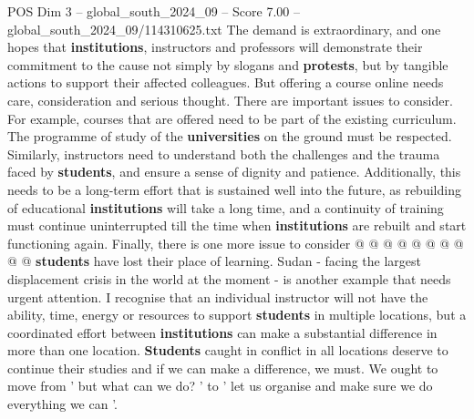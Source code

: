 \begin{textsample}{POS Dim 3 – global\_south\_2024\_09 – Score 7.00 – global\_south\_2024\_09/114310625.txt}
The demand is extraordinary, and one hopes that \textbf{institutions}, instructors and professors will demonstrate their commitment to the cause not simply by slogans and \textbf{protests}, but by tangible actions to support their affected colleagues.
But offering a course online needs care, consideration and serious thought.
There are important issues to consider.
For example, courses that are offered need to be part of the existing curriculum.
The programme of study of the \textbf{universities} on the ground must be respected.
Similarly, instructors need to understand both the challenges and the trauma faced by \textbf{students}, and ensure a sense of dignity and patience.
Additionally, this needs to be a long-term effort that is sustained well into the future, as rebuilding of educational \textbf{institutions} will take a long time, and a continuity of training must continue uninterrupted till the time when \textbf{institutions} are rebuilt and start functioning again.
Finally, there is one more issue to consider @ @ @ @ @ @ @ @ @ @ \textbf{students} have lost their place of learning.
Sudan - facing the largest displacement crisis in the world at the moment - is another example that needs urgent attention.
I recognise that an individual instructor will not have the ability, time, energy or resources to support \textbf{students} in multiple locations, but a coordinated effort between \textbf{institutions} can make a substantial difference in more than one location. \textbf{Students} caught in conflict in all locations deserve to continue their studies and if we can make a difference, we must.
We ought to move from ' but what can we do? ' to ' let us organise and make sure we do everything we can '.

\end{textsample}

